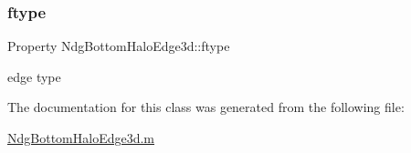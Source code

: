 \subsubsection{\texorpdfstring{ftype}{ftype}}
{\footnotesize\ttfamily Property Ndg\+Bottom\+Halo\+Edge3d\+::ftype\hspace{0.3cm}{\ttfamily [protected]}}



edge type 



The documentation for this class was generated from the following file\+:\begin{DoxyCompactItemize}
\item 
\hyperlink{_ndg_bottom_halo_edge3d_8m}{Ndg\+Bottom\+Halo\+Edge3d.\+m}\end{DoxyCompactItemize}
